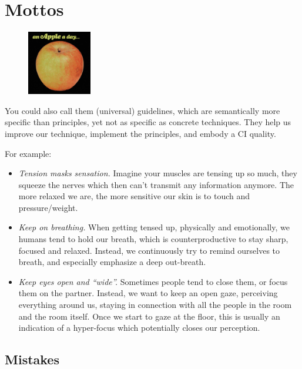 \section{Mottos}\label{sec:mottos}

\begin{figure}
\centering
\includegraphics[width=0.25\textwidth]{images/mottos}
\end{figure}

You could also call them (universal) guidelines, which are semantically more specific than principles, yet not as specific as concrete techniques.
They help us improve our technique, implement the principles, and embody a CI quality.

For example:

\begin{itemize}
    \item \textit{Tension masks sensation.} Imagine your muscles are tensing up so much, they squeeze the nerves which then can't transmit any information anymore.
    The more relaxed we are, the more sensitive our skin is to touch and pressure/weight.
    \item \textit{Keep on breathing.} When getting tensed up, physically and emotionally, we humans tend to hold our breath, which is counterproductive to stay sharp, focused and relaxed.
    Instead, we continuously try to remind ourselves to breath, and especially emphasize a deep out-breath.
    \item \textit{Keep eyes open and ``wide''.} Sometimes people tend to close them, or focus them on the partner.
    Instead, we want to keep an open gaze, perceiving everything around us, staying in connection with all the people in the room and the room itself.
    Once we start to gaze at the floor, this is usually an indication of a hyper-focus which potentially closes our perception.
\end{itemize}

\subsection{Mistakes}\label{subsec:mistakes}

